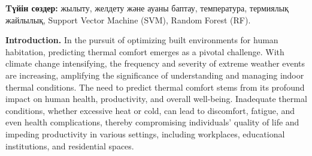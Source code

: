 {\bfseries Tүйін сөздер:} жылыту, желдету және ауаны баптау, температура,
термиялық жайлылық, Support Vector Machine (SVM), Random Forest (RF).

\begin{multicols}{2}
{\bfseries Introduction.} In the pursuit of optimizing built environments
for human habitation, predicting thermal comfort emerges as a pivotal
challenge. With climate change intensifying, the frequency and severity
of extreme weather events are increasing, amplifying the significance of
understanding and managing indoor thermal conditions. The need to
predict thermal comfort stems from its profound impact on human health,
productivity, and overall well-being. Inadequate thermal conditions,
whether excessive heat or cold, can lead to discomfort, fatigue, and
even health complications, thereby compromising individuals' quality of
life and impeding productivity in various settings, including
workplaces, educational institutions, and residential spaces.


\end{multicols}
